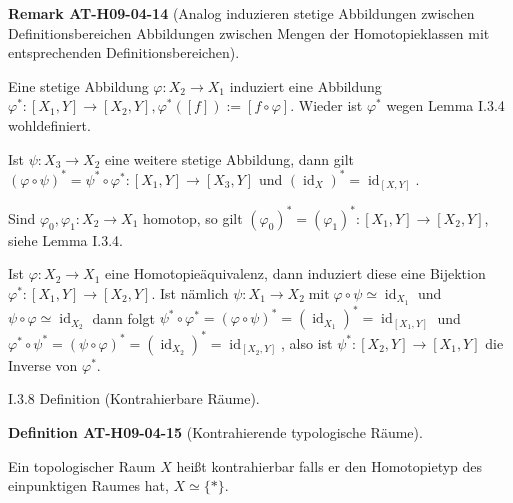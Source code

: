 \documentclass[10pt, letterpaper]{article}
\newcommand{\CustomHeading}[3]{%
  \par\medskip\noindent%
  \textbf{#1 #2} \textnormal{(#3)}.\enskip%
}
\newenvironment{DEF}[2]{\begin{unitbox}\CustomHeading{Definition}{#1}{#2}}{\end{unitbox}}
\newenvironment{REM}[2]{\begin{unitbox}\CustomHeading{Remark}{#1}{#2}}{\end{unitbox}}
\begin{document}
\begin{REM}{AT-H09-04-14}{Analog induzieren stetige Abbildungen zwischen Definitionsbereichen Abbildungen zwischen Mengen der Homotopieklassen mit entsprechenden Definitionsbereichen}
Eine stetige Abbildung $\varphi: X_{2} \rightarrow X_{1}$ induziert eine Abbildung $\varphi^{*}:\left[X_{1}, Y\right] \rightarrow\left[X_{2}, Y\right], \varphi^{*}([f]):=[f \circ \varphi]$. Wieder ist $\varphi^{*}$ wegen Lemma I.3.4 wohldefiniert. 

Ist $\psi: X_{3} \rightarrow X_{2}$ eine weitere stetige Abbildung, dann gilt $(\varphi \circ \psi)^{*}=\psi^{*} \circ \varphi^{*}:\left[X_{1}, Y\right] \rightarrow\left[X_{3}, Y\right]$ und $\left(\operatorname{id}_{X}\right)^{*}=\operatorname{id}_{[X, Y]}$. 

Sind $\varphi_{0}, \varphi_{1}: X_{2} \rightarrow X_{1}$ homotop, so gilt $\left(\varphi_{0}\right)^{*}=\left(\varphi_{1}\right)^{*}:\left[X_{1}, Y\right] \rightarrow\left[X_{2}, Y\right]$, siehe Lemma I.3.4. 

Ist $\varphi: X_{2} \rightarrow X_{1}$ eine Homotopieäquivalenz, dann induziert diese eine Bijektion $\varphi^{*}:\left[X_{1}, Y\right] \rightarrow\left[X_{2}, Y\right]$. Ist nämlich $\psi: X_{1} \rightarrow X_{2} \operatorname{mit} \varphi \circ \psi \simeq \operatorname{id}_{X_{1}}$ und $\psi \circ \varphi \simeq \operatorname{id}_{X_{2}}$ dann folgt $\psi^{*} \circ \varphi^{*}=(\varphi \circ \psi)^{*}=\left(\operatorname{id}_{X_{1}}\right)^{*}=\operatorname{id}_{\left[X_{1}, Y\right]}$ und $\varphi^{*} \circ \psi^{*}=(\psi \circ \varphi)^{*}=\left(\operatorname{id}_{X_{2}}\right)^{*}=\operatorname{id}_{\left[X_{2}, Y\right]}$, also ist $\psi^{*}:\left[X_{2}, Y\right] \rightarrow\left[X_{1}, Y\right]$ die Inverse von $\varphi^{*}$.
\end{REM}


I.3.8 Definition (Kontrahierbare Räume). 


\begin{DEF}{AT-H09-04-15}{Kontrahierende typologische Räume}
Ein topologischer Raum $X$ heißt kontrahierbar falls er den Homotopietyp des einpunktigen Raumes hat, $X \simeq\{*\}$.
\end{DEF}
\end{document}
